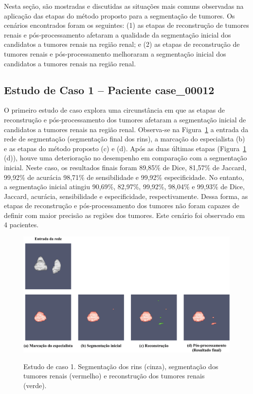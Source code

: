 Nesta seção, são mostradas e discutidas as situações mais comuns observadas na aplicação das etapas do método proposto para a segmentação de tumores. Os cenários encontrados foram os seguintes: (1) as etapas de reconstrução de tumores renais e pós-processamento afetaram a qualidade da segmentação inicial dos candidatos a tumores renais na região renal; e (2) as etapas de reconstrução de tumores renais e pós-processamento melhoraram a segmentação inicial dos candidatos a tumores renais na região renal.

\subsection{Estudo de Caso 1 – Paciente case\_00012}
\label{sec:estudo-tumores-caso-1}

O primeiro estudo de caso explora uma circunstância em que as etapas de reconstrução e pós-processamento dos tumores afetaram a segmentação inicial de candidatos a tumores renais na região renal. Observa-se na Figura~\ref{fig:estudo-tumores-1} a entrada da rede de segmentação (segmentação final dos rins), a marcação do especialista (b) e as etapas do método proposto (c) e (d). Após as duas últimas etapas (Figura~\ref{fig:estudo-tumores-1} (d)), houve uma deterioração no desempenho em comparação com a segmentação inicial. Neste caso, os resultados finais foram 89,85\% de Dice, 81,57\% de Jaccard, 99,92\% de acurácia 98,71\% de sensibilidade e 99,92\% especificidade. No entanto, a segmentação inicial atingiu 90,69\%, 82,97\%, 99,92\%, 98,04\% e 99,93\% de Dice, Jaccard, acurácia, sensibilidade e especificidade, respectivamente. Dessa forma, as etapas de reconstrução e pós-processamento dos tumores não foram capazes de definir com maior precisão as regiões dos tumores. Este cenário foi observado em 4 pacientes.


\begin{figure}[!ht]
    \centering
    \caption{Estudo de caso 1. Segmentação dos rins (cinza), segmentação dos tumores renais (vermelho) e reconstrução dos tumores renais (verde).}
    \includegraphics[width=1\textwidth]{figuras/estudos-casos-tumores-renais-1-12.pdf}
    \label{fig:estudo-tumores-1}
\end{figure}

